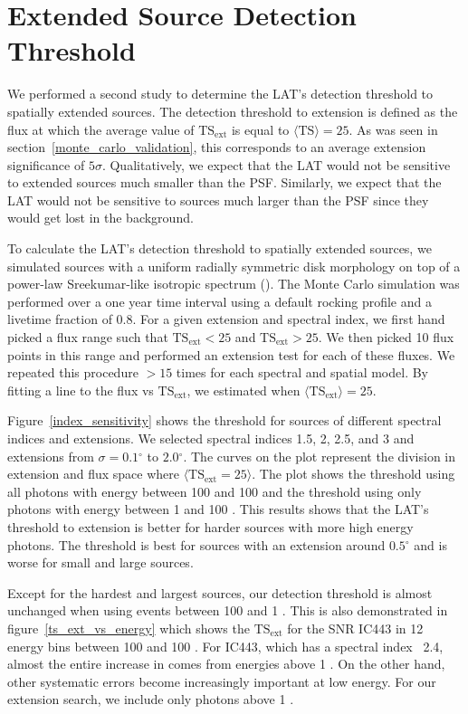 \documentclass[12pt,preprint]{aastex}
\newcommand{\mev}{\text{MeV}\xspace}
\newcommand{\gev}{\text{GeV}\xspace}
\newcommand{\tsext}{{\ensuremath{\text{TS}_\text{ext}}}\xspace}
\newcommand{\ts}{\text{TS}\xspace}
\renewcommand{\deg}{\ensuremath{^\circ}\xspace}
\begin{document}
\section{Extended Source Detection Threshold}\label{extension_sensitivity}

We performed a second study to determine the LAT's detection threshold
to spatially extended sources. The detection threshold to extension
is defined as the flux at which the average value of
$\tsext$ is equal to $\langle\ts\rangle=25$. As was seen in
section~\ref{monte_carlo_validation}, this corresponds to an average
extension significance of $5\sigma$.
Qualitatively, we expect that the LAT would not be sensitive to
extended sources much smaller than the PSF. Similarly,
we expect that the LAT would not be sensitive to sources
much larger than the PSF since they would get lost in the
background.

To calculate the LAT's detection threshold to spatially extended sources,
we simulated sources with a uniform radially symmetric disk
morphology on top of a power-law Sreekumar-like isotropic spectrum
(\cite{sreekumar_isotropic}).  The Monte Carlo simulation was performed
over a one year time interval using a default rocking profile and a
livetime fraction of 0.8.  For a given extension and spectral index, we
first hand picked a flux range such that $\tsext<25$ and $\tsext>25$. We
then picked 10 flux points in this range and performed an extension test
for each of these fluxes. We repeated this procedure $>15$ times for each
spectral and spatial model.  By fitting a line to the flux vs $\tsext$,
we estimated when $\langle\tsext\rangle=25$.

Figure~\ref{index_sensitivity} shows the threshold for
sources of different spectral indices and extensions.  We selected
spectral indices 1.5, 2, 2.5, and 3 and 
extensions from $\sigma=0.1\deg$ to $2.0\deg$.  The curves
on the plot represent the division in extension and flux space where
$\langle\tsext=25\rangle$.  The plot shows the threshold using all
photons with energy between 100 \mev and 100 \gev and the threshold
using only photons with energy between 1 \gev and 100 \gev.  This results
shows that the LAT's threshold to extension is better for harder sources
with more high energy photons. The threshold is best for sources with
an extension around $0.5\deg$ and is worse for small and large sources.

Except for the hardest and largest sources, our detection threshold is almost
unchanged when using events between 100 \mev and 1 \gev.  This is also
demonstrated in figure~\ref{ts_ext_vs_energy} which shows the \tsext for
the SNR IC443 in 12 energy bins between 100 \mev and 100 \gev. For IC443,
which has a spectral index ~2.4, almost the entire increase in \ts comes
from energies above 1 \gev.  On the other hand, other systematic errors
become increasingly important at low energy. For our extension search,
we include only photons above 1 \gev.
\end{document}
